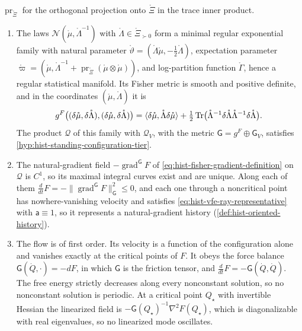 $\operatorname{pr}_{\mathring\Xi}$ for the orthogonal projection onto $\mathring\Xi$ in the trace inner
product.
\begin{enumerate}
\item[(a)] The laws $\mathcal N(\mathring\mu,\mathring\Lambda^{-1})$ with
$\mathring\Lambda\in\mathring\Xi_{\succ0}$ form a minimal regular exponential family with natural
parameter $\mathring\vartheta=(\mathring\Lambda\mathring\mu,-\tfrac12\mathring\Lambda)$, expectation
parameter
$\mathring\varpi=(\mathring\mu,\mathring\Lambda^{-1}+\operatorname{pr}_{\mathring\Xi}(\mathring\mu\otimes\mathring\mu))$,
and log-partition function $\mathring\Gamma$, hence a regular statistical manifold. Its Fisher metric
is smooth and positive definite, and in the coordinates $(\mathring\mu,\mathring\Lambda)$ it is
\begin{equation}
g^F\bigl((\delta\mathring\mu,\delta\mathring\Lambda),(\delta\mathring\mu,\delta\mathring\Lambda)\bigr)
=\langle\delta\mathring\mu,\mathring\Lambda\delta\mathring\mu\rangle
+\tfrac12\operatorname{Tr}\bigl(\mathring\Lambda^{-1}\delta\mathring\Lambda\mathring\Lambda^{-1}\delta\mathring\Lambda\bigr).
\label{eq:link-gaussian-fisher}
\end{equation}
The product $\mathcal Q$ of this family with $\mathcal Q_V$, with the metric
$\mathsf G=g^F\oplus\mathsf G_V$, satisfies \cref{hyp:hist-standing-configuration-tier}.
\item[(b)] The natural-gradient field $-\operatorname{grad}^{\mathsf G}F$ of
\eqref{eq:hist-fisher-gradient-definition} on $\mathcal Q$ is $C^1$, so its maximal integral curves
exist and are unique. Along each of them $\tfrac{d}{dt}F=-\lVert\operatorname{grad}^{\mathsf G}F\rVert_{\mathsf G}^2\leq0$,
and each one through a noncritical point has nowhere-vanishing velocity and satisfies
\eqref{eq:hist-vfe-ray-representative} with $\mathsf a\equiv1$, so it represents a natural-gradient
history (\cref{def:hist-oriented-history}).
\item[(c)] The flow is of first order. Its velocity is a function of the configuration alone and
vanishes exactly at the critical points of $F$. It obeys the force balance
$\mathsf G(\dot Q,\cdot)=-dF$, in which $\mathsf G$ is the friction tensor, and
$\tfrac{d}{dt}F=-\mathsf G(\dot Q,\dot Q)$. The free energy strictly decreases along every
nonconstant solution, so no nonconstant solution is periodic. At a critical point $Q_\star$ with
invertible Hessian the linearized field is $-\mathsf G(Q_\star)^{-1}\nabla^2F(Q_\star)$, which is
diagonalizable with real eigenvalues, so no linearized mode oscillates.

\end{enumerate}
